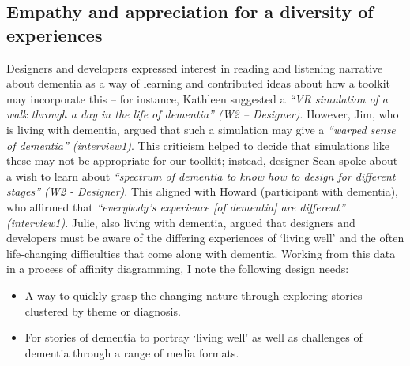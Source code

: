 \subsection{Empathy and appreciation for a diversity of experiences}
Designers and developers expressed interest in reading and listening narrative about dementia as a way of learning and contributed ideas about how a toolkit may incorporate this – for instance, Kathleen suggested a \textit{``VR simulation of a walk through a day in the life of dementia'' (W2 – Designer)}. However, Jim, who is living with dementia, argued that such a simulation may give a \textit{``warped sense of dementia'' (interview1)}. This criticism helped to decide that simulations like these may not be appropriate for our toolkit; instead, designer Sean spoke about a wish to learn about \textit{``spectrum of dementia to know how to design for different stages'' (W2 - Designer)}. This aligned with Howard (participant with dementia), who affirmed that \textit{``everybody’s experience [of dementia] are different'' (interview1)}. Julie, also living with dementia, argued that designers and developers must be aware of the differing experiences of `living well' and the often life-changing difficulties that come along with dementia. Working from this data in a process of affinity diagramming, I note the following design needs:
\begin{itemize}
    \item A way to quickly grasp the changing nature through exploring stories clustered by theme or diagnosis.
    \item For stories of dementia to portray ‘living well’ as well as challenges of dementia through a range of media formats.
\end{itemize}

